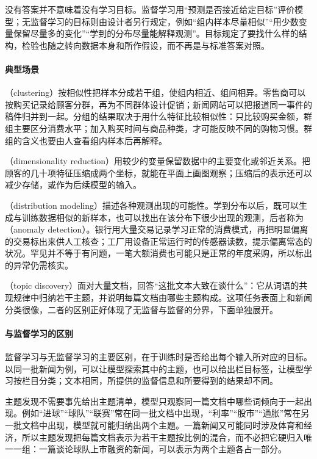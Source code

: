 没有答案并不意味着没有学习目标。监督学习用“预测是否接近给定目标”评价模型；无监督学习的目标则由设计者另行规定，例如“组内样本尽量相似”“用少数变量保留尽量多的变化”“学到的分布尽量能解释观测”。目标规定了要找什么样的结构，检验也随之转向数据本身和所作假设，而不再是与标准答案对照。

\paragraph{典型场景}

（clustering）按相似性把样本分成若干组，使组内相近、组间相异。零售商可以按购买记录给顾客分群，再为不同群体设计促销；新闻网站可以把报道同一事件的稿件归并到一起。分组的结果取决于用什么特征比较相似性：只比较购买金额，群组主要区分消费水平；加入购买时间与商品种类，才可能反映不同的购物习惯。群组的含义也要由人查看组内样本后再解释。

（dimensionality reduction）用较少的变量保留数据中的主要变化或邻近关系。把顾客的几十项特征压缩成两个坐标，就能在平面上画图观察；压缩后的表示还可以减少存储，或作为后续模型的输入。

（distribution modeling）描述各种观测出现的可能性。学到分布以后，既可以生成与训练数据相似的新样本，也可以找出在该分布下很少出现的观测，后者称为（anomaly detection）。银行用大量交易记录学习正常的消费模式，再把明显偏离的交易标出来供人工核查；工厂用设备正常运行时的传感器读数，提示偏离常态的状况。罕见并不等于有问题，一笔大额消费也可能只是正常的年度采购，所以标出的异常仍需核实。

（topic discovery）面对大量文档，回答“这批文本大致在谈什么”：它从词语的共现规律中归纳若干主题，并说明每篇文档由哪些主题构成。这项任务表面上和新闻分类很像，二者的区别正好体现了无监督与监督的分界，下面单独展开。

\paragraph{与监督学习的区别}

监督学习与无监督学习的主要区别，在于训练时是否给出每个输入所对应的目标。以同一批新闻为例，可以让模型探索其中的主题，也可以给出栏目标签，让模型学习按栏目分类；文本相同，所提供的监督信息和所要得到的结果却不同。

主题发现不需要事先给出主题清单，模型只观察同一篇文档中哪些词倾向于一起出现。例如“进球”“球队”“联赛”常在同一批文档中出现，“利率”“股市”“通胀”常在另一批文档中出现，模型就可能归纳出两个主题。一篇新闻又可能同时涉及体育和经济，所以主题发现把每篇文档表示为若干主题按比例的混合，而不必把它硬归入唯一一组：一篇谈论球队上市融资的新闻，可以表示为两个主题各占一部分。

